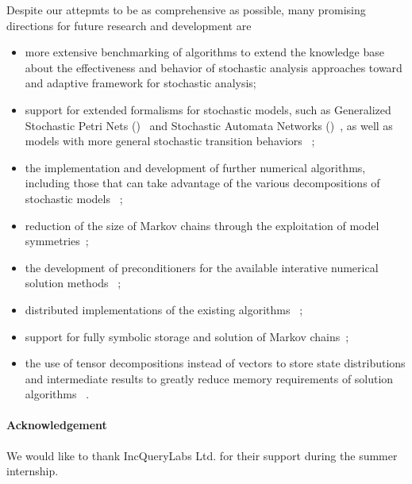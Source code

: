 Despite our attepmts to be as comprehensive as possible, many
promising directions for future research and development are
\begin{itemize}
\item more extensive benchmarking of algorithms to extend the
  knowledge base about the effectiveness and behavior of stochastic
  analysis approaches toward and adaptive framework for stochastic
  analysis;
\item support for extended formalisms for stochastic models, such as
  Generalized Stochastic Petri Nets ()~%
  \citep{DBLP:journals/tse/TeruelFP03} and Stochastic Automata Networks
  ()~\citep{DBLP:conf/pnpm/1985}, as well as models with
  more general stochastic transition behaviors~%
  \citep{Longo:2015:TSR:2767455.2767457};
\item the implementation and development of further numerical
  algorithms, including those that can take advantage of the various
  decompositions of stochastic models~%
  \citep{buchholz1999structured,buchholz2000multilevel,%
    dayar2012analyzing};
\item reduction of the size of Markov chains through the exploitation
  of model symmetries~\citep{buchholz1994exact,haddad1995evaluation};
\item the development of preconditioners for the available interative
  numerical solution methods~%
  \citep{DBLP:journals/informs/LangvilleS04};
\item distributed implementations of the existing algorithms~%
  \citep{DBLP:conf/imcsit/BylinaB08};
\item support for fully symbolic storage and solution of Markov
  chains~\citep{DBLP:journals/sigmetrics/CiardoM05,%
  DBLP:conf/qest/ZhaoC12,DBLP:conf/qest/2012};
\item the use of tensor decompositions instead of vectors to store
  state distributions and intermediate results to greatly reduce
  memory requirements of solution algorithms~%
  \citep{grasedyck2013literature,ballani2013projection,%
  dolgov2013tt}.
\end{itemize}

\paragraph{Acknowledgement} We would like to thank IncQueryLabs
Ltd. for their support during the summer internship.
